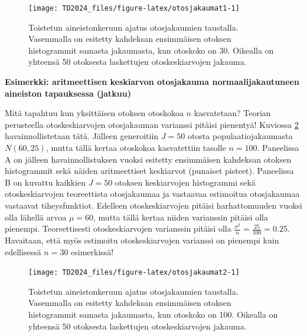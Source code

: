 \documentclass[
]{book}
\begin{document}
\FloatBarrier
\begin{figure}

{\centering \texttt{[image: TD2024\_files/figure-latex/otosjakaumat1-1]} 

}

\caption{Toistetun aineistonkeruun ajatus otosjakaumien taustalla. Vasemmalla on esitetty kahdeksan ensimmäisen otoksen histogrammit samasta jakaumasta, kun otoskoko on 30. Oikealla on yhteensä 50 otoksesta laskettujen otoskeskiarvojen jakauma.}\label{fig:otosjakaumat1}
\end{figure}

\begin{eblock}{}
\textbf{Esimerkki: aritmeettisen keskiarvon otosjakauma normaalijakautuneen aineiston tapauksessa (jatkuu)}

Mitä tapahtuu kun yksittäisen otoksen otoskokoa \(n\) kasvatetaan? Teorian perusteella otoskeskiarvojen otosjakauman varianssi pitäisi pienentyä! Kuviossa \ref{fig:otosjakaumat2} havainnollistetaan tätä. Jälleen generoitiin \(J=50\) otosta populaatiojakaumasta \(N(60,25)\), mutta tällä kertaa otoskokoa kasvatettiin tasolle \(n=100\). Paneelissa A on jälleen havainnollistuksen vuoksi esitetty ensimmäisen kahdeksan otoksen histogrammit sekä näiden aritmeettiset keskiarvot (punaiset pisteet). Paneelissa B on kuvattu kaikkien \(J=50\) otoksen keskiarvojen histogrammi sekä otoskeskiarvojen teoreettista otosjakaumaa ja vastaavaa estimoitua otosjakaumaa vastaavat tiheysfunktiot. Edelleen otoskeskiarvojen pitäisi harhattomuuden vuoksi olla lähellä arvoa \(\mu = 60\), mutta tällä kertaa niiden varianssin pitäisi olla pienempi. Teoreettisesti otoskeskiarvojen varianssin pitäisi olla \(\frac{\sigma^2}{n} = \frac{25}{100} = 0.25\). Havaitaan, että myös estimoitu otoskeskiarvojen varianssi on pienempi kuin edellisessä \(n=30\) esimerkissä!

\end{eblock}

\begin{figure}

{\centering \texttt{[image: TD2024\_files/figure-latex/otosjakaumat2-1]} 

}

\caption{Toistetun aineistonkeruun ajatus otosjakaumien taustalla. Vasemmalla on esitetty kahdeksan ensimmäisen otoksen histogrammit samasta jakaumasta, kun otoskoko on 100. Oikealla on yhteensä 50 otoksesta laskettujen otoskeskiarvojen jakauma.}\label{fig:otosjakaumat2}
\end{figure}
\end{document}
